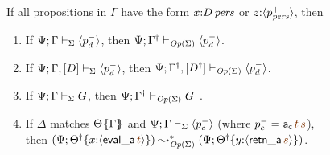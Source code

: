 \begin{theorem}\label{thm:opercomp}
If all propositions in $\Gamma$ have the form 
$x{:}{D}\,{{\it pers}}$ or $z{:}\langle {p^+_{{\it pers}}} \rangle$, then
\begin{enumerate}
\item  
If ${\Psi}; {\Gamma} \vdash_{\Sigma} {\langle {p^-_d} \rangle}$,
then ${\Psi}; {{{\Gamma}^\dag}} \vdash_{{\it Op}({\Sigma})} {\langle {p^-_d} \rangle}$.
\item  
If ${\Psi}; {\Gamma, [D]} \vdash_{\Sigma} {\langle {p^-_d} \rangle}$,
then ${\Psi}; {{{\Gamma}^\dag}, [{{D}^\dag}]} \vdash_{{\it Op}({\Sigma})} {\langle {p^-_d} \rangle}$.
\item  
If ${\Psi}; {\Gamma} \vdash_{\Sigma} {G}$,
then ${\Psi}; {{{\Gamma}^\dag}} \vdash_{{\it Op}({\Sigma})} {{{G}^\dag}}$.
\item
If $\Delta$ matches ${\Theta}\mbox{$\{\hspace{-4pt}\{$}{\Gamma}\mbox{$\}\hspace{-4pt}\}$}$ 
and ${\Psi}; {\Gamma} \vdash_{\Sigma} {\langle {p^-_c} \rangle}$
(where $p^-_c = {\sf a_c}\,\lf{t}\,\lf{s}$),\\
then
$(\Psi; \tackon{\opsubst{\Theta}}{x{:}\susp{{\sf eval\_a}\,\lf{t}}}) 
  \leadsto^*_{\transop{\Sigma}}
 (\Psi; \tackon{\opsubst{\Theta}}{y{:}\susp{{\sf retn\_a}\,\lf{s}}})$.
\end{enumerate}
\end{theorem}

